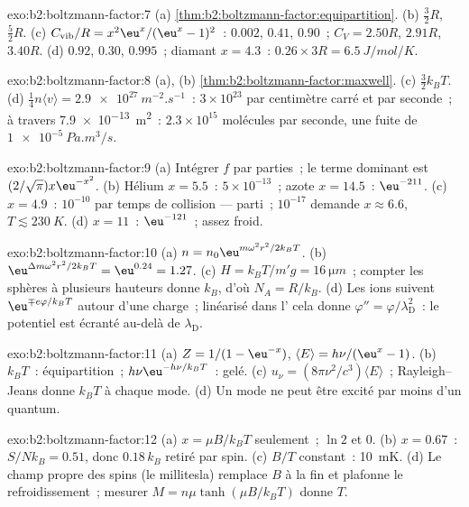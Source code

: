 \begin{solution}{exo:b2:boltzmann-factor:7}
(a) \cref{thm:b2:boltzmann-factor:equipartition}. (b) $\tfrac32R$,
$\tfrac52R$. (c) $C_{\text{vib}}/R = x^2\eu^x/(\eu^x - 1)^2$~: $0.002$, $0.41$, $0.90$~;
$C_V = 2.50R$, $2.91R$, $3.40R$. (d) $0.92$, $0.30$, $0.995$~; diamant $x = 4.3$~:
$0.26 \times 3R = \qty{6.5}{J/mol/K}$.
\end{solution}

\begin{solution}{exo:b2:boltzmann-factor:8}
(a), (b) \cref{thm:b2:boltzmann-factor:maxwell}. (c) $\tfrac32k_BT$. (d)
$\tfrac14n\langle v\rangle = \qty{2.9e27}{m^{-2}.s^{-1}}$~: $3 \times 10^{23}$ par centimètre
carré et par seconde~; à travers \qty{7.9e-13}{m^2}~: $2.3 \times 10^{15}$
molécules par seconde, une fuite de $\qty{1e-5}{Pa.m^3/s}$.
\end{solution}

\begin{solution}{exo:b2:boltzmann-factor:9}
(a) Intégrer $f$ par parties~; le terme dominant est $(2/\sqrt\pi)x\eu^{-x^2}$. (b)
Hélium $x = 5.5$~: $5 \times 10^{-13}$~; azote $x = 14.5$~: $\eu^{-211}$. (c) $x =
4.9$~: $10^{-10}$ par temps de collision --- parti~; $10^{-17}$ demande $x \approx 6.6$,
$T \lesssim \qty{230}{K}$. (d) $x = 11$~: $\eu^{-121}$~; assez froid.
\end{solution}

\begin{solution}{exo:b2:boltzmann-factor:10}
(a) $n = n_0\eu^{m\omega^2r^2/2k_BT}$. (b) $\eu^{\Delta m\omega^2r^2/2k_BT} = \eu^{0.24} =
1.27$. (c) $H = k_BT/m'g = \qty{16}{\micro m}$~; compter les sphères à
plusieurs hauteurs donne $k_B$, d'où $N_A = R/k_B$. (d) Les ions suivent
$\eu^{\mp e\varphi/k_BT}$ autour d'une charge~; linéarisé dans l'
cela donne $\varphi'' = \varphi/\lambda_{\text{D}}^2$~: le potentiel est écranté
au-delà de $\lambda_{\text{D}}$.
\end{solution}

\begin{solution}{exo:b2:boltzmann-factor:11}
(a) $Z = 1/(1 - \eu^{-x})$, $\langle E\rangle = h\nu/(\eu^x - 1)$. (b) $k_BT$~:
équipartition~; $h\nu\eu^{-h\nu/k_BT}$~: gelé. (c) $u_\nu = (8\pi\nu^2/c^3)\langle E
\rangle$~; Rayleigh--Jeans donne $k_BT$ à chaque mode. (d) Un mode ne peut être
excité par moins d'un quantum.
\end{solution}

\begin{solution}{exo:b2:boltzmann-factor:12}
(a) $x = \mu B/k_BT$ seulement~; $\ln 2$ et $0$. (b) $x = 0.67$~: $S/Nk_B = 0.51$, donc
$0.18\,k_B$ retiré par spin. (c) $B/T$ constant~: \qty{10}{mK}. (d) Le champ propre
des spins (le millitesla) remplace $B$ à la fin et plafonne le refroidissement~;
mesurer $M = n\mu\tanh(\mu B/k_BT)$ donne $T$.
\end{solution}

